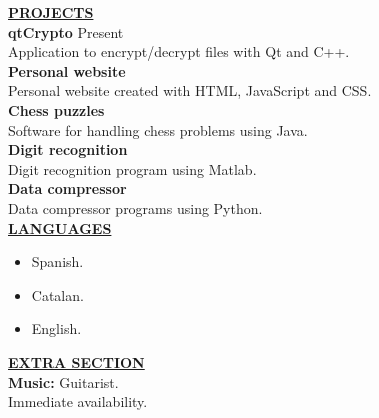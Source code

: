 \documentclass{article}
\begin{document}
	\noindent \textbf{\underline{PROJECTS}} \\
	\noindent \textbf{qtCrypto}  \hfill  Present \\
	Application to encrypt/decrypt files with Qt and C++. \\
	\noindent \textbf{Personal website}  \\
	Personal website created with HTML, JavaScript and CSS. \\
	\noindent \textbf{Chess puzzles}  \\
	Software for handling chess problems using Java. \\
	\noindent \textbf{Digit recognition}  \\
	Digit recognition program using Matlab. \\
	\noindent \textbf{Data compressor}  \\
	Data compressor programs using Python. \\
	
	
	\noindent \textbf{\underline{LANGUAGES}} \\
	\begin{itemize}[noitemsep,nolistsep,leftmargin=*]
		\item {Spanish.}
		\item {Catalan.}
		\item {English. \\}
	\end{itemize}
	

	\noindent \textbf{\underline{EXTRA SECTION}} \\
	\noindent \textbf{Music:} Guitarist. \\
	\noindent Immediate availability.
	
	
\end{document}
